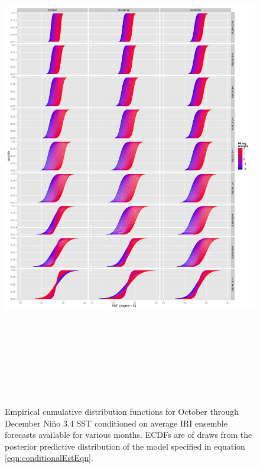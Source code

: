 \documentclass[authoryear]{article}
\begin{document}
\begin{figure}[!htbp]
\begin{center}
  \includegraphics[height=22cm, keepaspectratio]{Pricingfigs/conditionalCDFs10to12TraditionalCDFconfig}
  \caption{Empirical cumulative distribution functions for October through December Ni\~no 3.4 SST conditioned on average IRI ensemble forecasts available for various months. ECDFs are of draws from the posterior predictive distribution of the model specified in equation \ref{eqn:conditionalEstEqn}.}
   \label{fig:conditionalCDFs10to12}
   \end{center}
\end{figure}
\end{document}

